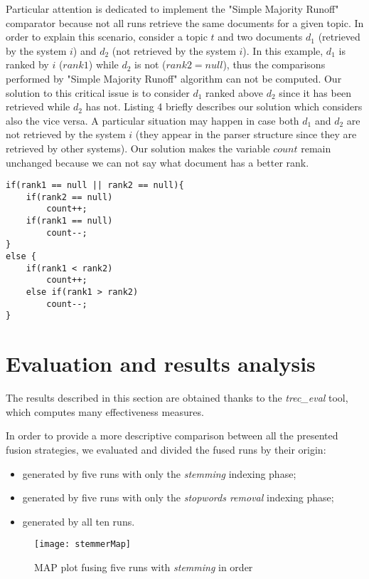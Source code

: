 \documentclass[letterpaper, 10 pt, conference]{ieeeconf}  %
\begin{document}
Particular attention is dedicated to implement the "Simple Majority Runoff" comparator because not all runs retrieve the same documents for a given topic. In order to explain this scenario, consider a topic $t$ and two documents $d_1$ (retrieved by the system $i$) and $d_2$ (not retrieved by the system $i$). In this example, $d_1$ is ranked by $i$ ($rank1$) while $d_2$ is not ($rank2 = null$), thus the comparisons performed by "Simple Majority Runoff" algorithm can not be computed. Our solution to this critical issue is to consider $d_1$ ranked above $d_2$ since it has been retrieved while $d_2$ has not. Listing 4 briefly describes our solution which considers also the vice versa. A particular situation may happen in case both $d_1$ and $d_2$ are not retrieved by the system $i$ (they appear in the parser structure since they are retrieved by other systems). Our solution makes the variable $count$ remain unchanged because we can not say what document has a better rank. 

\begin{lstlisting}[caption={Simple Majority Runoff implementation detail}]
if(rank1 == null || rank2 == null){
    if(rank2 == null)
        count++;
    if(rank1 == null)
        count--;
}
else {
    if(rank1 < rank2)
        count++;
    else if(rank1 > rank2)
        count--;
}
\end{lstlisting}

\section{Evaluation and results analysis}
The results described in this section are obtained thanks to the \textit{trec\_eval} tool, which computes many effectiveness measures.

In order to provide a more descriptive comparison between all the presented fusion strategies, we evaluated and divided the fused runs by their origin: 
\begin{itemize}
\item generated by five runs with only the \textit{stemming} indexing phase;
\item generated by five runs with only the \textit{stopwords removal} indexing phase;
\item generated by all ten runs.  
\end{itemize}

\begin{figure}[!htbp]
\centering
\texttt{[image: stemmerMap]}
\caption{MAP plot fusing five runs with \textit{stemming} in order}
\label{FIG:Combining five runs with stemming in order}
\end{figure}
\end{document}
